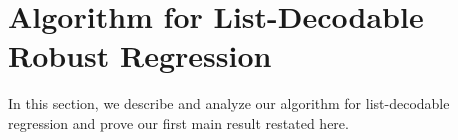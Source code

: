 


\section{Algorithm for List-Decodable Robust Regression}
In this section, we describe and analyze our algorithm for list-decodable regression and prove our first main result restated here.
\main*





